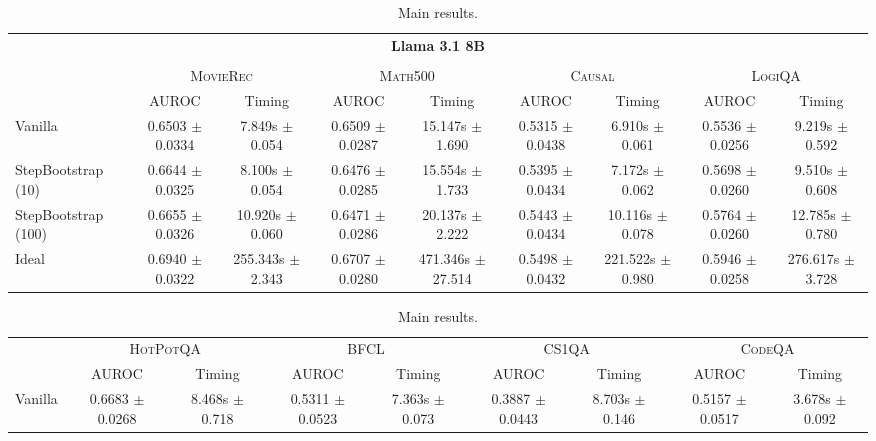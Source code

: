 \begin{table}[t]
    \caption{Main results.}
    \label{tab:main-results}
    \begin{tabular}{lcccccccc}
        \toprule
        \multicolumn{9}{c}{\textbf{Llama 3.1 8B}} \\
        \vspace{-5pt}\\
        \multirow{2}{*}{} & \multicolumn{2}{c}{\textsc{MovieRec}} & \multicolumn{2}{c}{\textsc{Math500}} & \multicolumn{2}{c}{\textsc{Causal}} & \multicolumn{2}{c}{\textsc{LogiQA}} \\
        \cmidrule(lr){2-3} \cmidrule(lr){4-5} \cmidrule(lr){6-7} \cmidrule(lr){8-9}
          & AUROC & Timing & AUROC & Timing & AUROC & Timing & AUROC & Timing \\
        \cmidrule(lr){2-3} \cmidrule(lr){4-5} \cmidrule(lr){6-7} \cmidrule(lr){8-9}
        Vanilla & 0.6503 $\pm$ 0.0334 & 7.849s $\pm$ 0.054 & 0.6509 $\pm$ 0.0287 & 15.147s $\pm$ 1.690 & 0.5315 $\pm$ 0.0438 & 6.910s $\pm$ 0.061 & 0.5536 $\pm$ 0.0256 & 9.219s $\pm$ 0.592 \\
        StepBootstrap (10) & 0.6644 $\pm$ 0.0325 & 8.100s $\pm$ 0.054 & 0.6476 $\pm$ 0.0285 & 15.554s $\pm$ 1.733 & 0.5395 $\pm$ 0.0434 & 7.172s $\pm$ 0.062 & 0.5698 $\pm$ 0.0260 & 9.510s $\pm$ 0.608 \\
        StepBootstrap (100) & 0.6655 $\pm$ 0.0326 & 10.920s $\pm$ 0.060 & 0.6471 $\pm$ 0.0286 & 20.137s $\pm$ 2.222 & 0.5443 $\pm$ 0.0434 & 10.116s $\pm$ 0.078 & 0.5764 $\pm$ 0.0260 & 12.785s $\pm$ 0.780 \\
        Ideal & 0.6940 $\pm$ 0.0322 & 255.343s $\pm$ 2.343 & 0.6707 $\pm$ 0.0280 & 471.346s $\pm$ 27.514 & 0.5498 $\pm$ 0.0432 & 221.522s $\pm$ 0.980 & 0.5946 $\pm$ 0.0258 & 276.617s $\pm$ 3.728 \\
    \end{tabular}
    \vspace{5pt}
    \begin{tabular}{lcccccccc}
        \multirow{2}{*}{} & \multicolumn{2}{c}{\textsc{HotPotQA}} & \multicolumn{2}{c}{\textsc{BFCL}} & \multicolumn{2}{c}{\textsc{CS1QA}} & \multicolumn{2}{c}{\textsc{CodeQA}} \\
        \cmidrule(lr){2-3} \cmidrule(lr){4-5} \cmidrule(lr){6-7} \cmidrule(lr){8-9}
          & AUROC & Timing & AUROC & Timing & AUROC & Timing & AUROC & Timing \\
        \cmidrule(lr){2-3} \cmidrule(lr){4-5} \cmidrule(lr){6-7} \cmidrule(lr){8-9}
        Vanilla & 0.6683 $\pm$ 0.0268 & 8.468s $\pm$ 0.718 & 0.5311 $\pm$ 0.0523 & 7.363s $\pm$ 0.073 & 0.3887 $\pm$ 0.0443 & 8.703s $\pm$ 0.146 & 0.5157 $\pm$ 0.0517 & 3.678s $\pm$ 0.092 \\

\end{tabular}
\end{table}
